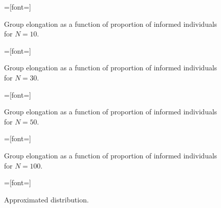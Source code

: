 
\setlength{}
\setlength{}

\begin{figure}[H]
{}=[font=\scriptsize]

\caption{Group elongation as a function of proportion of informed individuals for $N=10$.}
\label{fig:elong10}
\end{figure}

\begin{figure}[H]
{}=[font=\scriptsize]

\caption{Group elongation as a function of proportion of informed individuals for $N=30$.}
\label{fig:elong30}
\end{figure}

\begin{figure}[H]
{}=[font=\scriptsize]

\caption{Group elongation as a function of proportion of informed individuals for $N=50$.}
\label{fig:elong50}
\end{figure}

\begin{figure}[H]
{}=[font=\scriptsize]

\caption{Group elongation as a function of proportion of informed individuals for $N=100$.}
\label{fig:elong100}
\end{figure}
\vfill

\begin{figure}[H]
{}=[font=\scriptsize]

\caption{Approximated distribution.}
\label{fig:elong100}
\end{figure}